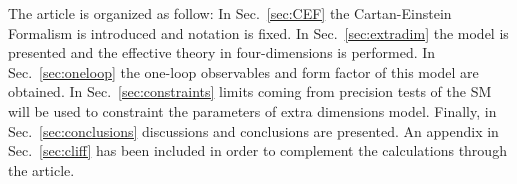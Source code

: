 The article is organized as follow: In Sec.~\ref{sec:CEF}  the Cartan-Einstein Formalism is introduced and notation is fixed. In Sec.~\ref{sec:extradim} the model is presented and the effective theory in four-dimensions is performed. In Sec.~\ref{sec:oneloop} the one-loop observables and form factor of this model are obtained. In Sec.~\ref{sec:constraints} limits coming from precision tests of the SM will be used to constraint the parameters of extra dimensions model. Finally, in Sec.~\ref{sec:conclusions} discussions and conclusions are presented. An appendix in Sec.~\ref{sec:cliff} has been included in order to complement the calculations through the article.
